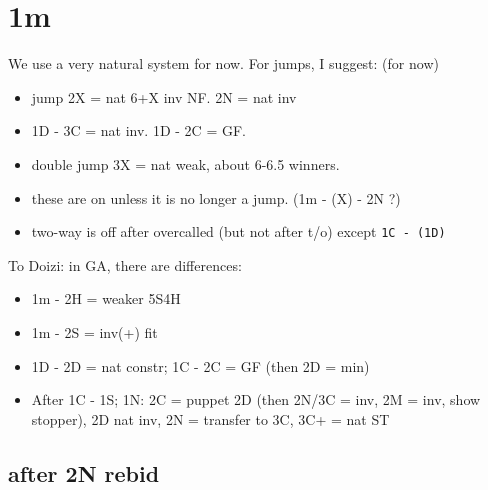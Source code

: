 \section{1m}

We use a very natural system for now. For jumps, I suggest: (for now)
\begin{itemize}
    \setlength\itemsep{0pt}
    \item jump 2X = nat 6+X inv NF. 2N = nat inv
    \item 1D - 3C = nat inv. 1D - 2C = GF.
    \item double jump 3X = nat weak, about 6-6.5 winners.
    \item these are on unless it is no longer a jump. (1m - (X) - 2N ?)
    \item two-way is off after overcalled (but not after t/o) except \texttt{1C - (1D)}
\end{itemize}

{\color{RubineRed}
To Doizi: in GA, there are differences:
\begin{itemize}
    \setlength\itemsep{0pt}
    \item 1m - 2H = weaker 5S4H
    \item 1m - 2S = inv(+) fit
    \item 1D - 2D = nat constr; 1C - 2C = GF (then 2D = min)
    \item After 1C - 1S; 1N: 2C = puppet 2D (then 2N/3C = inv, 2M = inv, show stopper), 2D nat inv, 2N = transfer to 3C, 3C+ = nat ST
\end{itemize}
}

\subsection{after 2N rebid}

